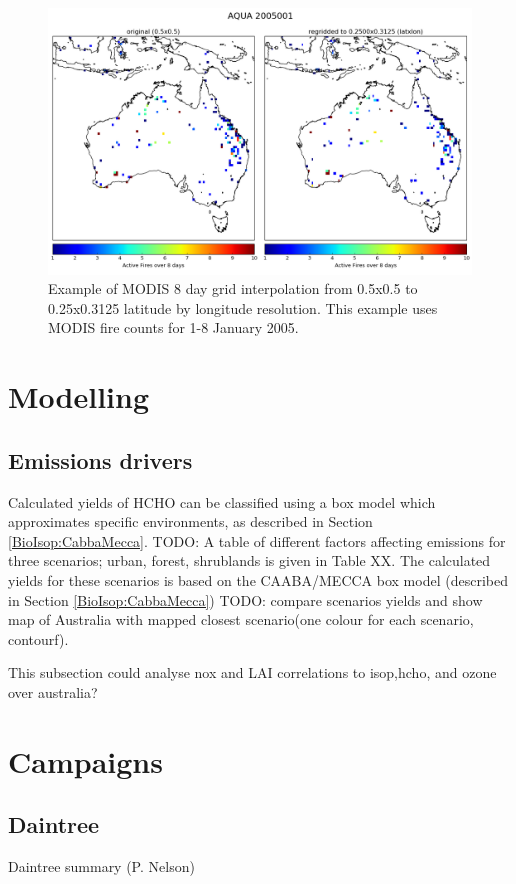       \begin{figure}[!htbp]\begin{center}
          \includegraphics[width=\textwidth]{Figures/MODIS_Regrid_Comparison.png}
          \caption{Example of MODIS 8 day grid interpolation from 0.5x0.5 to 0.25x0.3125 latitude by longitude resolution.
            This example uses MODIS fire counts for 1-8 January 2005.}
          \label{ch_HCHO:fig:modisinterpolation}
        \end{center}\end{figure}
        
\section{Modelling}
  \subsection{Emissions drivers}
  Calculated yields of HCHO can be classified using a box model which approximates specific environments, as described in Section \ref{BioIsop:CabbaMecca}.
  TODO: A table of different factors affecting emissions for three scenarios; urban, forest, shrublands is given in Table XX.
  The calculated yields for these scenarios is based on the CAABA/MECCA box model (described in Section \ref{BioIsop:CabbaMecca}) TODO: compare scenarios yields and show map of Australia with mapped closest scenario(one colour for each scenario, contourf).
  
  This subsection could analyse nox and LAI correlations to isop,hcho, and ozone over australia?
 
\section{Campaigns}

  \subsection{Daintree}
  Daintree summary (P. Nelson)